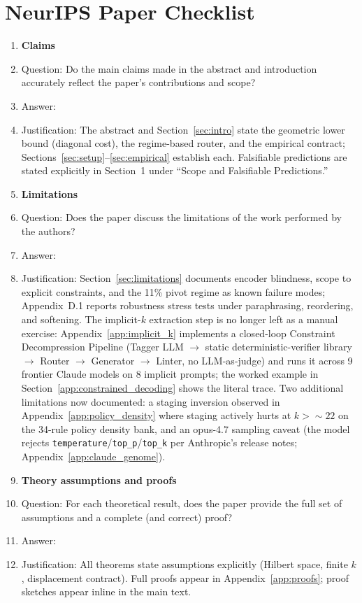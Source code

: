 \section*{NeurIPS Paper Checklist}

\begin{enumerate}

\item {\bf Claims}
    \item[] Question: Do the main claims made in the abstract and introduction accurately reflect the paper's contributions and scope?
    \item[] Answer: \answerYes{}
    \item[] Justification: The abstract and Section~\ref{sec:intro} state the geometric lower bound (diagonal cost), the regime-based router, and the empirical contract; Sections~\ref{sec:setup}--\ref{sec:empirical} establish each. Falsifiable predictions are stated explicitly in Section~1 under ``Scope and Falsifiable Predictions.''

\item {\bf Limitations}
    \item[] Question: Does the paper discuss the limitations of the work performed by the authors?
    \item[] Answer: \answerYes{}
    \item[] Justification: Section~\ref{sec:limitations} documents encoder blindness, scope to explicit constraints, and the 11\% pivot regime as known failure modes; Appendix~D.1 reports robustness stress tests under paraphrasing, reordering, and softening. The implicit-$k$ extraction step is no longer left as a manual exercise: Appendix~\ref{app:implicit_k} implements a closed-loop Constraint Decompression Pipeline (Tagger LLM $\to$ static deterministic-verifier library $\to$ Router $\to$ Generator $\to$ Linter, no LLM-as-judge) and runs it across 9 frontier Claude models on 8 implicit prompts; the worked example in Section~\ref{app:constrained_decoding} shows the literal trace. Two additional limitations now documented: a staging inversion observed in Appendix~\ref{app:policy_density} where staging actively hurts at $k > {\sim}22$ on the 34-rule policy density bank, and an opus-4.7 sampling caveat (the model rejects \texttt{temperature}/\texttt{top\_p}/\texttt{top\_k} per Anthropic's release notes; Appendix~\ref{app:claude_genome}).

\item {\bf Theory assumptions and proofs}
    \item[] Question: For each theoretical result, does the paper provide the full set of assumptions and a complete (and correct) proof?
    \item[] Answer: \answerYes{}
    \item[] Justification: All theorems state assumptions explicitly (Hilbert space, finite $k$, displacement contract). Full proofs appear in Appendix~\ref{app:proofs}; proof sketches appear inline in the main text.


\end{enumerate}
